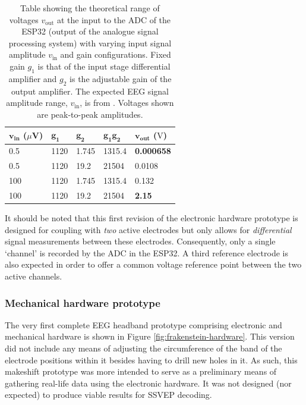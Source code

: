 \begin{table}[]
\centering
\begin{tabular}{@{}lllll@{}}
\toprule
\textbf{$\mathbf{v_{\textrm{in}}}$} ($\mu$V) & \textbf{$\mathbf{g_1}$} & \textbf{$\mathbf{g_2}$} & \textbf{$\mathbf{g_1g_2}$} & \textbf{$\mathbf{v_{\textrm{out}}}$} ($\textrm{V}$)\\ \midrule
0.5          & 1120        & 1.745       & 1315.4          & \textbf{0.000658}        \\
0.5          & 1120        & 19.2        & 21504           & 0.0108          \\
100          & 1120        & 1.745       & 1315.4          & 0.132           \\
100          & 1120        & 19.2        & 21504           & \textbf{2.15}            \\ \bottomrule
\end{tabular}
\caption[Table showing the theoretical range of voltages measured at the ADC of the ESP32 for varying input signal magnitudes and gain configurations]{Table showing the theoretical range of voltages $v_{\textrm{out}}$ at the input to the ADC of the ESP32 (output of the analogue signal processing system) with varying input signal amplitude $v_{\textrm{in}}$ and gain configurations. Fixed gain $g_1$ is that of the input stage differential amplifier and $g_2$ is the adjustable gain of the output amplifier. The expected EEG signal amplitude range, $v_{\textrm{in}}$, is from \cite{teplan-eeg-measurement}. Voltages shown are peak-to-peak amplitudes.}
\label{tab:gain-voltage-ranges}
\end{table}

It should be noted that this first revision of the electronic hardware prototype is designed for coupling with \textit{two} active electrodes but only allows for \textit{differential} signal measurements between these electrodes. Consequently, only a single `channel' is recorded by the ADC in the ESP32. A third reference electrode is also expected in order to offer a common voltage reference point between the two active channels. 

\subsubsection{Mechanical hardware prototype}
\label{subsection:mech-hardware-frankenstein}
The very first complete EEG headband prototype comprising electronic and mechanical hardware is shown in Figure \ref{fig:frakenstein-hardware}. This version did not include any means of adjusting the circumference of the band of the electrode positions within it besides having to drill new holes in it. As such, this makeshift prototype was more intended to serve as a preliminary means of gathering real-life data using the electronic hardware. It was not designed (nor expected) to produce viable results for SSVEP decoding. 

